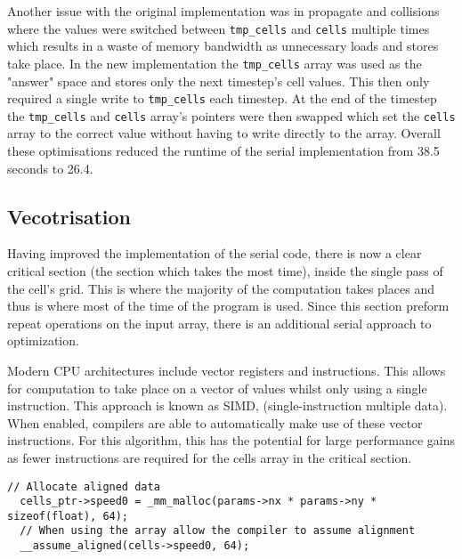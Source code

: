 \documentclass{article}
\begin{document}
\begin{multicols}{2}
Another issue with the original implementation was in  propagate and collisions
where the values were switched between \verb|tmp_cells| and \verb|cells| multiple
times which results in a waste of memory bandwidth as unnecessary loads and
stores take place. In the new implementation the \verb|tmp_cells| array was
used as the "answer" space and stores only the next timestep's cell values.
This then only required a single write to \verb|tmp_cells| each timestep. At
the end of the timestep the \verb|tmp_cells| and \verb|cells| array's pointers
were then swapped which set the \verb|cells| array to the correct value without
having to write directly to the array. Overall these optimisations reduced the 
runtime of the serial implementation from 38.5 seconds to 26.4.

\subsection{Vecotrisation}

Having improved the implementation of the serial code, there is now a clear
critical section (the section which takes the most time), inside the single
pass of the cell's grid. This is where the majority of the computation takes places
and thus is where most of the time of the program is used. Since this section
preform repeat operations on the input array, there is an additional serial
approach to optimization.

Modern CPU architectures include vector registers and instructions. This allows
for computation to take place on a vector of values whilst only using a single
instruction. This approach is known as SIMD, (single-instruction multiple
data). When enabled, compilers are able to automatically make use of these
vector instructions. For this algorithm, this has the potential for large
performance gains as fewer instructions are required for the cells array in the
critical section.

\begin{lstlisting}[style=CStyle, label={lst:cellsdataalign}, caption={Example of memory allignment for a cells array.},]
  // Allocate aligned data
  cells_ptr->speed0 = _mm_malloc(params->nx * params->ny * sizeof(float), 64);
  // When using the array allow the compiler to assume alignment
  __assume_aligned(cells->speed0, 64);
\end{lstlisting}


\end{multicols}
\end{document}
